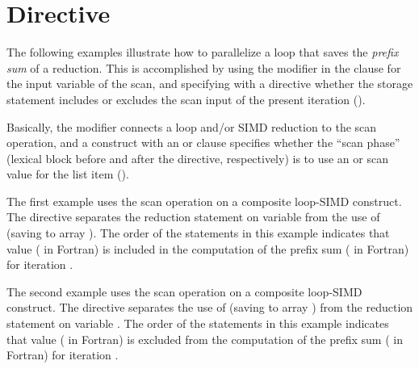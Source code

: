 \section{ Directive}
\label{sec:scan}

The following examples illustrate how to parallelize a loop that saves 
the \emph{prefix sum} of a reduction. This is accomplished by using 
the  modifier in the  clause for the input 
variable of the scan, and specifying with a  directive whether 
the storage statement includes or excludes the scan input of the present 
iteration ().

Basically, the  modifier connects a loop and/or SIMD reduction to 
the scan operation, and a  construct with an  or 
 clause specifies whether the ``scan phase'' (lexical block 
before and after the directive, respectively) is to use an  or 
 scan value for the list item ().

The first example uses the  scan operation on a composite
loop-SIMD construct. The  directive separates the reduction 
statement on variable  from the use of  (saving to array ).
The order of the statements in this example indicates that
value  ( in Fortran) is included in the computation of 
the prefix sum  ( in Fortran) for iteration .



The second example uses the  scan operation on a composite
loop-SIMD construct. The  directive separates the use of  
(saving to array ) from the reduction statement on variable .
The order of the statements in this example indicates that
value  ( in Fortran) is excluded from the computation 
of the prefix sum  ( in Fortran) for iteration .

